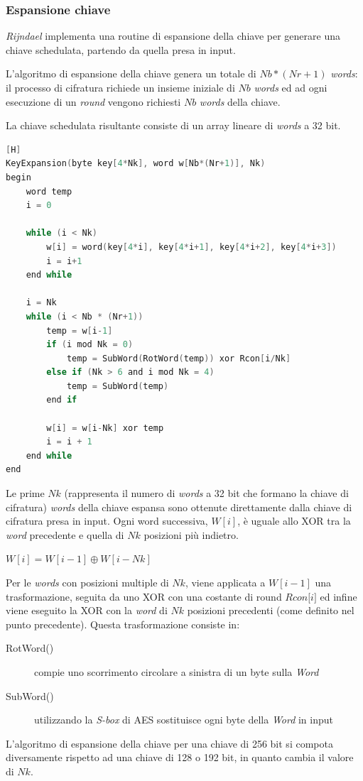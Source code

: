 \documentclass[a4paper,11pt]{article}
\begin{document}
\subsubsection{Espansione chiave}
\textit{Rijndael} implementa una routine di espansione della chiave per generare una chiave schedulata, partendo da quella presa in input.

L'algoritmo di espansione della chiave genera un totale di $Nb * (Nr +1)$ \textit{words}: il processo di cifratura richiede un insieme iniziale di $Nb$ \textit{words} ed ad ogni esecuzione di un \textit{round} vengono richiesti $Nb$ \textit{words} della chiave.

La chiave schedulata risultante consiste di un array lineare di \textit{words} a 32 bit.

\begin{lstlisting}[language=c, caption={Pseudo Code for the Key Expansion}, frame=single][H]
KeyExpansion(byte key[4*Nk], word w[Nb*(Nr+1)], Nk)
begin
    word temp
    i = 0

    while (i < Nk)
        w[i] = word(key[4*i], key[4*i+1], key[4*i+2], key[4*i+3])
        i = i+1
    end while
    
    i = Nk
    while (i < Nb * (Nr+1))
        temp = w[i-1]
        if (i mod Nk = 0)
            temp = SubWord(RotWord(temp)) xor Rcon[i/Nk]
        else if (Nk > 6 and i mod Nk = 4)
            temp = SubWord(temp)
        end if
        
        w[i] = w[i-Nk] xor temp
        i = i + 1
    end while
end
\end{lstlisting}
\bigbreak
Le prime $Nk$ (rappresenta il numero di \textit{words} a 32 bit che formano la chiave di cifratura) \textit{words} della chiave espansa sono ottenute direttamente dalla chiave di cifratura presa in input.
\bigbreak
Ogni word successiva, $W[i]$, è uguale allo XOR tra la \textit{word} precedente e quella di $Nk$ posizioni più indietro.
\begin{center}
    $W[i] = W[i-1] \oplus W[i-Nk]$
\end{center}
\bigbreak
Per le \textit{words} con posizioni multiple di $Nk$, viene applicata a $W[i-1]$ una trasformazione, seguita da uno XOR con una costante di round $\textit{Rcon[i]}$ ed infine viene eseguito la XOR con la \textit{word} di $Nk$ posizioni precedenti (come definito nel punto precedente).
\bigbreak
Questa trasformazione consiste in:
\begin{description}
    \item[RotWord()] compie uno scorrimento circolare a sinistra di un byte sulla \textit{Word}
    \item[SubWord()] utilizzando la \textit{S-box} di AES sostituisce ogni byte della \textit{Word} in input 
\end{description}
\bigbreak
L'algoritmo di espansione della chiave per una chiave di 256 bit  si compota diversamente rispetto ad una chiave di 128 o 192 bit, in quanto cambia il valore di $Nk$.
\end{document}
